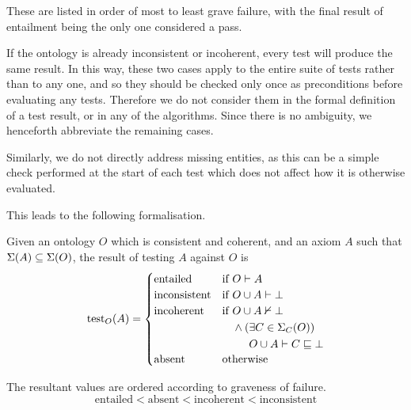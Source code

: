 \documentclass[paper.tex]{subfiles}
\begin{document}
These are listed in order of most to least grave failure, with the final result of entailment being the only one considered a pass.

If the ontology is already inconsistent or incoherent, every test will produce the same result.  In this way, these two cases apply to the entire suite of tests rather than to any one, and so they should be checked only once as preconditions before evaluating any tests.  Therefore we do not consider them in the formal definition of a test result, or in any of the algorithms.  Since there is no ambiguity, we henceforth abbreviate the remaining cases.

Similarly, we do not directly address missing entities, as this can be a simple check performed at the start of each test which does not affect how it is otherwise evaluated.

This leads to the following formalisation.

\begin{definition}
  Given an ontology $O$ which is consistent and coherent, and an axiom $A$ such that $\Sigma(A) \subseteq \Sigma(O)$, the result of testing $A$ against $O$ is
  \[
    \test_O(A) =
    \begin{cases}
      \mathrm{entailed} &
        \text{if } O \sementails A \\
      \mathrm{inconsistent} &
        \text{if } O \union A \sementails \bot \\
      \mathrm{incoherent} &
        \text{if }
        \! \begin{aligned}[t]
          & O \union A \nsementails \bot \\
          & \land (\exists C \in \signature_C(O)) \\
          & \phantom{{}\land (} O \union A \sementails C \sqsubseteq \bot
        \end{aligned} \\
      \mathrm{absent} &
        \text {otherwise} \\
    \end{cases}
  \]

  The resultant values are ordered according to graveness of failure.
  \[ \mathrm{entailed} < \mathrm{absent} < \mathrm{incoherent} < \mathrm{inconsistent} \]
\end{definition}
\end{document}
